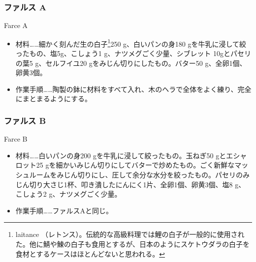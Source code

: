 \begin{recette}

\hypertarget{farces-poissons-braises-a}{%
\subsubsection{ファルス A}\label{farces-poissons-braises-a}}

\begin{frsubenv}

Farce A

\end{frsubenv}


\begin{itemize}
\item
  材料\ldots{}\ldots{}細かく刻んだ生の白子\footnote{laitance
    （レトンス）。伝統的な高級料理では鯉の白子が一般的に使用された。他に鯖や鰊の白子も食用とするが、日本のようにスケトウダラの白子を食材とするケースはほとんどないと思われる。}250
  g、白いパンの身180 gを牛乳に浸して絞ったもの、塩5g、こしょう1
  g、ナツメグごく少量、シブレット 10gとパセリの葉5 g、セルフイユ20
  gをみじん切りにしたもの。バター50 g、全卵1個、卵黄3個。
\item
  作業手順\ldots{}\ldots{}陶製の鉢に材料をすべて入れ、木のヘラで全体をよく練り、完全にまとまるようにする。
\end{itemize}

\atoaki{}

\hypertarget{farces-poissons-braises-b}{%
\subsubsection{ファルス B}\label{farces-poissons-braises-b}}

\begin{frsubenv}

Farce B

\end{frsubenv}


\begin{itemize}
\item
  材料\ldots{}\ldots{}白いパンの身200
  gを牛乳に浸して絞ったもの。玉ねぎ50 gとエシャロット25
  gを細かいみじん切りにしてバターで炒めたもの。ごく新鮮なマッシュルームをみじん切りにし、圧して余分な水分を絞ったもの。パセリのみじん切り大さじ1杯、叩き潰したにんにく1片、全卵1個、卵黄3個、塩8
  g、こしょう2 g、ナツメグごく少量。
\item
  作業手順\ldots{}\ldots{}ファルスAと同じ。
\end{itemize}

\end{recette}

